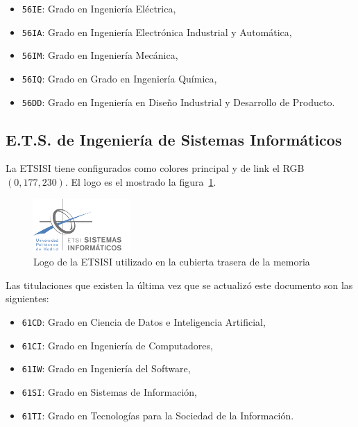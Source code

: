 \begin{itemize}
    \item \texttt{56IE}: Grado en Ingeniería Eléctrica,
    \item \texttt{56IA}: Grado en Ingeniería Electrónica Industrial y Automática,
    \item \texttt{56IM}: Grado en Ingeniería Mecánica,
    \item \texttt{56IQ}: Grado en Grado en Ingeniería Química,
    \item \texttt{56DD}: Grado en Ingeniería en Diseño Industrial y Desarrollo de Producto.
\end{itemize}

\subsection{E.T.S. de Ingeniería de Sistemas Informáticos}

La ETSISI tiene configurados como colores principal y de link el RGB $(0,177,230)$. El logo es el mostrado la figura~\ref{fig:logo-etsisi}.

\begin{figure}[ht]
    \centering
    \includegraphics[width=10em]{upm-report/logos/logo-etsisi}
    \caption{\label{fig:logo-etsisi}Logo de la ETSISI utilizado en la cubierta trasera de la memoria}
\end{figure}

Las titulaciones que existen la última vez que se actualizó este documento son las siguientes:

\begin{itemize}
    \item \texttt{61CD}: Grado en Ciencia de Datos e Inteligencia Artificial,
    \item \texttt{61CI}: Grado en Ingeniería de Computadores,
    \item \texttt{61IW}: Grado en Ingeniería del Software,
    \item \texttt{61SI}: Grado en Sistemas de Información,
    \item \texttt{61TI}: Grado en Tecnologías para la Sociedad de la Información.
\end{itemize}
